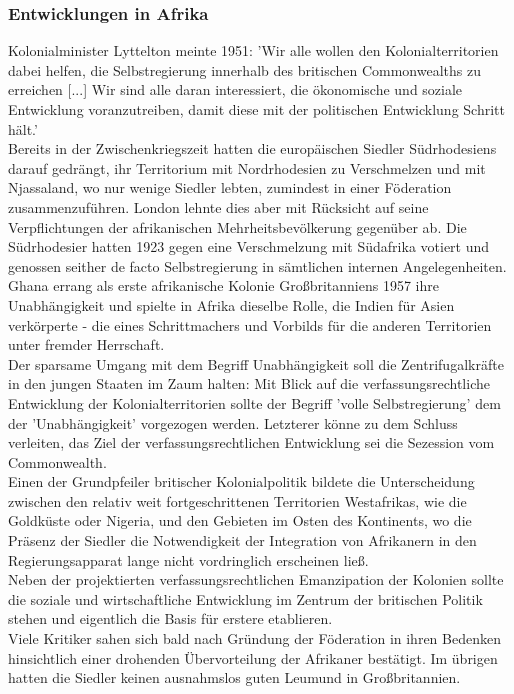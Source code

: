 \documentclass[letterpaper, 12pt]{article}
\let\tempsubsubsection\subsubsection
\renewcommand\subsubsection[1]{\vspace{0cm}\tempsubsubsection{#1}\vspace{0cm}}
\begin{document}
\subsubsection{Entwicklungen in Afrika}

Kolonialminister Lyttelton meinte 1951: 'Wir alle wollen den Kolonialterritorien dabei helfen, die Selbstregierung innerhalb des britischen Commonwealths zu erreichen [...] Wir sind alle daran interessiert, die ökonomische und soziale Entwicklung voranzutreiben, damit diese mit der politischen Entwicklung Schritt hält.' \\
Bereits in der Zwischenkriegszeit hatten die europäischen Siedler Südrhodesiens darauf gedrängt, ihr Territorium mit Nordrhodesien zu Verschmelzen und mit Njassaland, wo nur wenige Siedler lebten, zumindest in einer Föderation zusammenzuführen. London lehnte dies aber mit Rücksicht auf seine Verpflichtungen der afrikanischen Mehrheitsbevölkerung gegenüber ab. Die Südrhodesier hatten 1923 gegen eine Verschmelzung mit Südafrika votiert und genossen seither de facto Selbstregierung in sämtlichen internen Angelegenheiten. \\
Ghana errang als erste afrikanische Kolonie Großbritanniens 1957 ihre Unabhängigkeit und spielte in Afrika dieselbe Rolle, die Indien für Asien verkörperte - die eines Schrittmachers und Vorbilds für die anderen Territorien unter fremder Herrschaft. \\
Der sparsame Umgang mit dem Begriff Unabhängigkeit soll die Zentrifugalkräfte in den jungen Staaten im Zaum halten: Mit Blick auf die verfassungsrechtliche Entwicklung der Kolonialterritorien sollte der Begriff 'volle Selbstregierung' dem der 'Unabhängigkeit' vorgezogen werden. Letzterer könne zu dem Schluss verleiten, das Ziel der verfassungsrechtlichen Entwicklung sei die Sezession vom Commonwealth. \\
Einen der Grundpfeiler britischer Kolonialpolitik bildete die Unterscheidung zwischen den relativ weit fortgeschrittenen Territorien Westafrikas, wie die Goldküste oder Nigeria, und den Gebieten im Osten des Kontinents, wo die Präsenz der Siedler die Notwendigkeit der Integration von Afrikanern in den Regierungsapparat lange nicht vordringlich erscheinen ließ. \\
Neben der projektierten verfassungsrechtlichen Emanzipation der Kolonien sollte die soziale und wirtschaftliche Entwicklung im Zentrum der britischen Politik stehen und eigentlich die Basis für erstere etablieren. \\
Viele Kritiker sahen sich bald nach Gründung der Föderation in ihren Bedenken hinsichtlich einer drohenden Übervorteilung der Afrikaner bestätigt. Im übrigen hatten die Siedler keinen ausnahmslos guten Leumund in Großbritannien.
\end{document}
